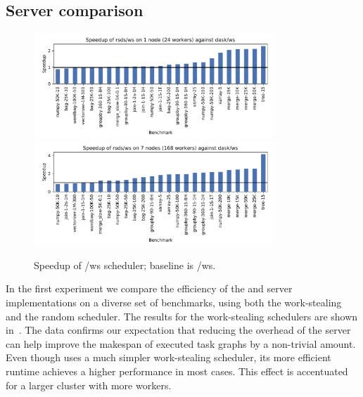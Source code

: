 \subsection*{Server comparison}

\begin{figure}[h]
	\centering
	\includegraphics[width=0.8\textwidth]{./imgs/rsds/charts/speedup-rsds-ws-1}
	\includegraphics[width=0.8\textwidth]{./imgs/rsds/charts/speedup-rsds-ws-7}
	\caption{Speedup of \rsds{}/ws scheduler; baseline is \dask{}/ws.}
	\label{fig:rsds-dask-ws-all}
\end{figure}

In the first experiment we compare the efficiency of the \rsds{} and
\dask{} server implementations on a diverse set of benchmarks, using both the
work-stealing and the random scheduler. The results for the work-stealing schedulers are shown
in~. The data confirms our expectation that reducing the overhead of the
server can help improve the makespan of executed task graphs by a non-trivial amount. Even though
\rsds{} uses a much simpler work-stealing scheduler, its more efficient runtime
achieves a higher performance in most cases. This effect is accentuated for a larger cluster with
more workers.


